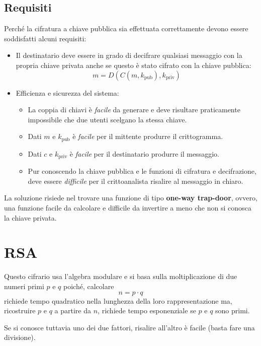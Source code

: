 \subsection{Requisiti}
Perch\'e la cifratura a chiave pubblica sia effettuata correttamente devono essere soddisfatti alcuni requisiti:
\begin{itemize}
	\item Il destinatario deve essere in grado di decifrare qualsiasi messaggio con la propria chiave privata anche se
	      questo \`e stato cifrato con la chiave pubblica:
	      \[ m = D(C(m, k_{\text{pub}}), k_{\text{priv}}) \]
	\item Efficienza e sicurezza del sistema:
	      \begin{itemize}
		      \item La coppia di chiavi \`e \emph{facile} da generare e deve risultare praticamente impossibile che due
		            utenti scelgano la stessa chiave.
		      \item Dati $m$ e $k_{\text{pub}}$ \`e \emph{facile} per il mittente produrre il crittogramma.
		      \item Dati $c$ e $k_{\text{priv}}$ \`e \emph{facile} per il destinatario produrre il messaggio.
		      \item Pur conoscendo la chiave pubblica e le funzioni di cifratura e decifrazione, deve essere
		            \emph{difficile} per il crittoanalista risalire al messaggio in chiaro.
	      \end{itemize}
\end{itemize}
La soluzione risiede nel trovare una funzione di tipo \textbf{one-way trap-door}, ovvero, una funzione facile da
calcolare e difficile da invertire a meno che non si conosca la chiave privata.

\section{RSA}
Questo cifrario usa l'algebra modulare e si basa sulla moltiplicazione di due numeri primi $p$ e $q$ poich\'e,
calcolare
\[ n = p \cdot q \]
richiede tempo quadratico nella lunghezza della loro rappresentazione ma, ricostruire $p$ e $q$ a partire da $n$,
richiede tempo esponenziale se $p$ e $q$ sono primi.

Se si conosce tuttavia uno dei due fattori, risalire all'altro \`e facile (basta fare una divisione).

